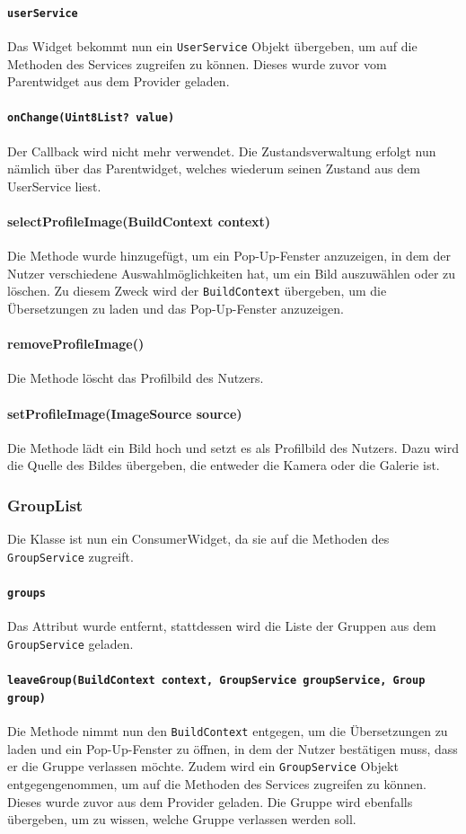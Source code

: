 \documentclass{implementierungsheft}
\begin{document}
\paragraph{\texttt{userService}}
Das Widget bekommt nun ein \texttt{UserService} Objekt übergeben, um auf die Methoden des Services zugreifen zu können. Dieses wurde zuvor vom Parentwidget aus dem Provider geladen.
\paragraph{\texttt{onChange(Uint8List? value)}}
Der Callback wird nicht mehr verwendet. Die Zustandsverwaltung erfolgt nun nämlich über das Parentwidget, welches wiederum seinen Zustand aus dem UserService liest.
\paragraph{selectProfileImage(BuildContext context)}
Die Methode wurde hinzugefügt, um ein Pop-Up-Fenster anzuzeigen, in dem der Nutzer verschiedene Auswahlmöglichkeiten hat, um ein Bild auszuwählen oder zu löschen. Zu diesem Zweck wird der \texttt{BuildContext} übergeben, um die Übersetzungen zu laden und das Pop-Up-Fenster anzuzeigen.
\paragraph*{removeProfileImage()}
Die Methode löscht das Profilbild des Nutzers.
\paragraph*{setProfileImage(ImageSource source)}
Die Methode lädt ein Bild hoch und setzt es als Profilbild des Nutzers. Dazu wird die Quelle des Bildes übergeben, die entweder die Kamera oder die Galerie ist.
\subsubsection*{GroupList}
Die Klasse ist nun ein ConsumerWidget, da sie auf die Methoden des \texttt{GroupService} zugreift.
\paragraph{\texttt{groups}}
Das Attribut wurde entfernt, stattdessen wird die Liste der Gruppen aus dem \texttt{GroupSer\-vice} geladen.
\paragraph{\texttt{leaveGroup(BuildContext context, GroupService groupService, Group group)}}
Die Methode nimmt nun den \texttt{BuildContext} entgegen, um die Übersetzungen zu laden und ein Pop-Up-Fenster zu öffnen, in dem der Nutzer bestätigen muss, dass er die Gruppe verlassen möchte. Zudem wird ein \texttt{GroupService} Objekt entgegengenommen, um auf die Methoden des Services zugreifen zu können. Dieses wurde zuvor aus dem Provider geladen. Die Gruppe wird ebenfalls übergeben, um zu wissen, welche Gruppe verlassen werden soll.
\end{document}
